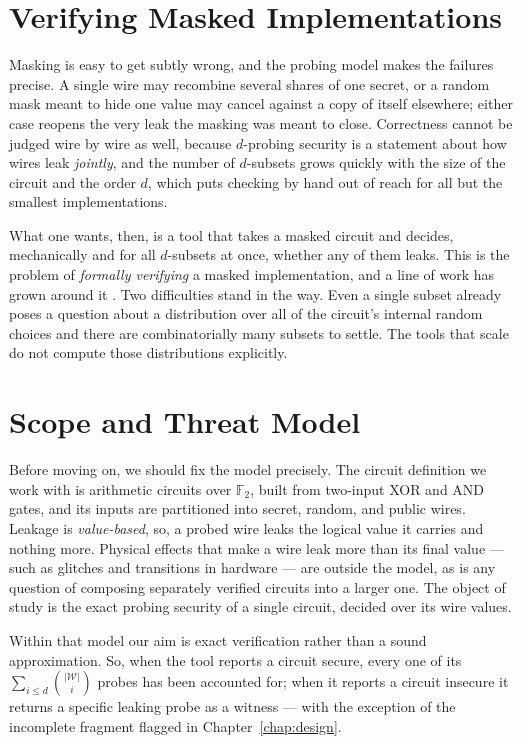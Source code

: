 \section{Verifying Masked Implementations}
\label{sec:intro-verification}

Masking is easy to get subtly wrong, and the probing model makes the failures
precise. A single wire may recombine several
shares of one secret, or a random mask meant to hide one value may cancel against a
copy of itself elsewhere; either case reopens the very leak the masking was meant to
close. Correctness cannot be judged wire by wire as well, because $d$-probing security
is a statement about how wires leak \emph{jointly}, and the number of $d$-subsets
grows quickly with the size of the circuit and the order $d$, which puts checking by
hand out of reach for all but the smallest implementations.

What one wants, then, is a tool that takes a masked circuit and decides,
mechanically and for all $d$-subsets at once, whether any of them leaks. This is the
problem of \emph{formally verifying} a masked implementation, and a line of work has
grown around it \parencite{barthe2015verified, 10.1007/978-3-030-29959-0_15}. Two
difficulties stand in the way. Even a single subset already poses a question about a
distribution over all of the circuit's internal random choices
and there are combinatorially many subsets to settle. The tools
that scale do not compute those distributions explicitly.

\section{Scope and Threat Model}
\label{sec:intro-scope}

Before moving on, we should fix the model precisely. The circuit definition we work with
is arithmetic circuits over $\mathbb{F}_2$,
built from two-input XOR and AND gates, and its inputs are partitioned into secret,
random, and public wires. Leakage is \emph{value-based}, so, a probed wire leaks the
logical value it carries and nothing more. Physical effects that make a wire leak
more than its final value --- such as glitches and transitions in hardware
\parencite{10.1007/978-3-030-29959-0_15} --- are outside the model, as is any question
of composing separately verified circuits into a larger one. The object of study is
the exact probing security of a single circuit, decided over its wire values.

Within that model our aim is exact verification rather than a sound approximation.
So, when the tool reports a circuit secure, every one of its $\sum_{i \le d}
\binom{|\mathcal{W}|}{i}$ probes has been accounted for; when it reports a
circuit insecure it returns a specific leaking probe as a witness --- with the
exception of the incomplete fragment flagged in
Chapter~\ref{chap:design}. %

